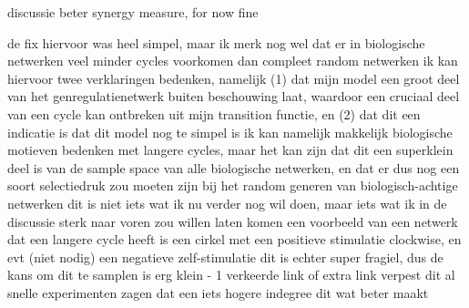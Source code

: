 \documentclass[../main.tex]{subfiles}
\begin{document}



discussie beter synergy measure, for now fine


de fix hiervoor was heel simpel, maar ik merk nog wel dat er in biologische netwerken veel minder cycles voorkomen dan compleet random netwerken
ik kan hiervoor twee verklaringen bedenken, namelijk (1) dat mijn model een groot deel van het genregulatienetwerk buiten beschouwing laat, waardoor een cruciaal deel van een cycle kan ontbreken uit mijn transition functie, en (2) dat dit een indicatie is dat dit model nog te simpel is
ik kan namelijk makkelijk biologische motieven bedenken met langere cycles, maar het kan zijn dat dit een superklein deel is van de sample space van alle biologische netwerken, en dat er dus nog een soort selectiedruk zou moeten zijn bij het random generen van biologisch-achtige netwerken
dit is niet iets wat ik nu verder nog wil doen, maar iets wat ik in de discussie sterk naar voren zou willen laten komen
een voorbeeld van een netwerk dat een langere cycle heeft is een cirkel met een positieve stimulatie clockwise, en evt (niet nodig) een negatieve zelf-stimulatie
dit is echter super fragiel, dus de kans om dit te samplen is erg klein - 1 verkeerde link of extra link verpest dit al
snelle experimenten zagen dat een iets hogere indegree dit wat beter maakt
\end{document}
